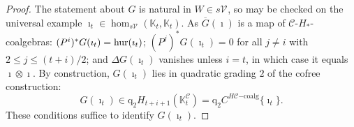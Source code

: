 \documentclass[11pt]{amsart} \renewcommand{\baselinestretch}{1.2}
\theoremstyle{plain}
\theoremstyle{definition}
\newcommand{\DASH}{\mathrm{-}}
\renewcommand{\to}{\longrightarrow}
\newcommand{\calV}{\mathcal{V}}
\newcommand{\calc}{\mathcal{C}}
\newcommand{\vect}[2]{\calV^{#1}_{#2}}
\newcommand{\HC}[1]{H#1\mathrm{-coalg}}
\newcommand{\quadgrad}[1]{\mathrm{q}_{#1}}
\renewcommand{\mapsto}{\longmapsto}
\begin{document}
\begin{Operations on the Bousfield-Kan spectral sequence}
\begin{proof}
The statement about $G$ is natural in $W\in s\vect{}{}$, so may be checked on the universal example $\imath_t\in \hom_{s\vect{}{}}(\mathbb{K}_t,\mathbb{K}_t)$. As $\overline{G}(\imath)$ is a map of $\calc$-$H_*$-coalgebras: $(P^i)^*G(\imath_t)=\textup{hur}(\imath_t)$; $(P^j)^*G(\imath_t)=0$ for all $j\neq i$ with $2\leq j\leq (t+i)/2$; and $\Delta G(\imath_t)$ vanishes unless $i=t$, in which case it equals $\imath\otimes \imath$. By construction, $G(\imath_t)$ lies in quadratic grading $2$ of the cofree construction:
\[G(\imath_t)\in\quadgrad{2}H_{t+i+1}(\mathbb{K}^{\calc}_t)=\quadgrad{2}C^{\HC{\calc}}\{\imath_t\}.\]
These conditions suffice to identify $G(\imath_t)$.
%
\end{proof}






\end{Operations on the Bousfield-Kan spectral sequence}
\end{document}

